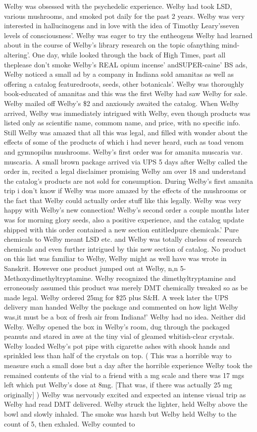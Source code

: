 \documentclass[12pt]{book}
\begin{document}
Welby was obsessed with the psychedelic experience. Welby had took LSD, various mushrooms, and smoked pot daily for the past 2 years. Welby was very interested in hallucinogens and in love with the idea of Timothy Leary'sseven levels of consciousness'. Welby was eager to try the entheogens Welby had learned about in the course of Welby's library research on the topic ofanything mind-altering'. One day, while looked through the back of High Times, past all theplease don't smoke Welby's REAL opium incense' andSUPER-caine' BS ads, Welby noticed a small ad by a company in Indiana sold amanitas as well as offering a catalog featuredroots, seeds, other botanicals'. Welby was thoroughly book-educated of amanitas and this was the first Welby had saw Welby for sale. Welby mailed off Welby's \$2 and anxiously awaited the catalog. When Welby arrived, Welby was immediately intrigued with Welby, even though products was listed only as scientific name, commom name, and price, with no specific info. Still Welby was amazed that all this was legal, and filled with wonder about the effects of some of the products of which i had never heard, such as toad venom and gymnopilus mushrooms. Welby's first order was for amanita muscaria var. muscaria. A small brown package arrived via UPS 5 days after Welby called the order in, recited a legal disclaimer promising Welby am over 18 and understand the catalog's products are not sold for consumption. During Welby's first amanita trip i don't know if Welby was more amazed by the effects of the mushrooms or the fact that Welby could actually order stuff like this legally. Welby was very happy with Welby's new connection! Welby's second order a couple months later was for morning glory seeds, also a positive experience, and the catalog update shipped with this order contained a new section entitledpure chemicals.' Pure chemicals to Welby meant LSD etc. and Welby was totally clueless of research chemicals and even further intrigued by this new section of catalog. No product on this list was familiar to Welby, Welby might as well have was wrote in Sanskrit. However one product jumped out at Welby, n,n 5-Methoxydimethyltryptamine. Welby recognized the dimethyltryptamine and erroneously assumed this product was merely DMT chemically tweaked so as be made legal. Welby ordered 25mg for \$25 plus S\&H. A week later the UPS delivery man handed Welby the package and commented on how light Welby was,it must be a box of fresh air from Indiana!' Welby had no idea. Neither did Welby. Welby opened the box in Welby's room, dug through the packaged peanuts and stared in awe at the tiny vial of gleamed whitish-clear crystals. Welby loaded Welby's pot pipe with cigarette ashes with shook hands and sprinkled less than half of the crystals on top. ( This was a horrible way to measure such a small dose but a day after the horrible experience Welby took the remained contents of the vial to a friend with a mg scale and there was 17 mgs left which put Welby's dose at 8mg. [That was, if there was actually 25 mg originally] ) Welby was nervously excited and expected an intense visual trip as Welby had read DMT delivered. Welby struck the lighter, held Welby above the bowl and slowly inhaled. The smoke was harsh but Welby held Welby to the count of 5, then exhaled. Welby counted to 
\end{document}
